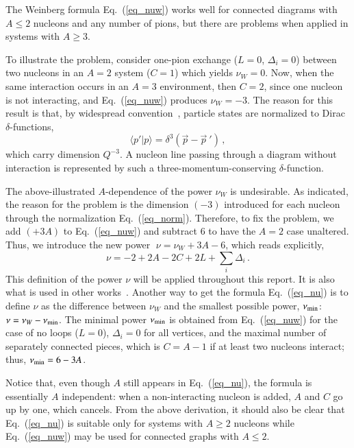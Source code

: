 \documentclass[sort&compress,preprint,3p]{elsarticle}
\begin{document}
The Weinberg formula 
Eq.~(\ref{eq_nuw})
works well for connected diagrams
with $A \leq 2$ nucleons and any number of pions, 
but there are problems when applied in 
systems with $A\geq 3$.

To illustrate the problem, consider
one-pion exchange 
($L=0$, $\Delta_i=0$) 
between two nucleons
in an $A=2$ system ($C=1$) which yields 
$\nu_W=0$.
Now, when the same interaction occurs
in an $A=3$ environment, then $C=2$, since one
nucleon is not interacting, and 
Eq.~(\ref{eq_nuw}) 
produces $\nu_W=-3$.
The reason for this result is that, by widespread convention~\cite{PDG},
particle states are normalized to Dirac $\delta$-functions,
\begin{equation}
\langle p' | p \rangle = 
\delta^3(\vec p - {\vec p}~') 
\,,
\label{eq_norm}
\end{equation}
which carry dimension $Q^{-3}$.
A nucleon line 
passing through a diagram
without interaction is represented by such a 
three-momentum-conserving
$\delta$-function. 

The above-illustrated $A$-dependence of the power $\nu_W$
is undesirable.
As indicated, the reason for the problem is the dimension $(-3)$
introduced for each nucleon through the normalization Eq.~(\ref{eq_norm}).
Therefore, to fix the problem,
we add $(+3A)$ to Eq.~(\ref{eq_nuw}) and subtract $6$ to have the $A=2$ case
unaltered.
Thus, we introduce the new power $\; \nu=\nu_W+3A-6$, which reads explicitly,
\begin{equation} \nu = -2 +2A - 2C + 2L 
+ \sum_i \Delta_i \, .  
\label{eq_nu} 
\end{equation}
This definition of the power $\nu$ will be applied
throughout this report.
It is also what is used in other works~\cite{Epe06}.
Another way to get the formula Eq.~(\ref{eq_nu}) is to define $\nu$
as the difference between $\nu_W$ and the smallest possible power,
$\nu_{\rm min}$: $\nu=\nu_W-\nu_{\rm min}$.
The minimal power $\nu_{\rm min}$ is obtained from Eq.~(\ref{eq_nuw})
for the case of no loops ($L=0$), $\Delta_i=0$ for all vertices, and the 
maximal number of separately connected pieces, which is $C=A-1$
if at least two nucleons interact;
thus, $\nu_{\rm min}=6-3A$.

Notice that, even though $A$ still appears in 
Eq.~(\ref{eq_nu}), 
the formula is essentially $A$ independent:
when a non-interacting nucleon is added,
$A$ and $C$ go up by one, which cancels.
From the above derivation, 
it should also be clear that Eq.~(\ref{eq_nu})
is suitable only for systems with $A \geq 2$ nucleons
while 
Eq.~(\ref{eq_nuw})
may be used for connected graphs with $A \leq 2$.
\end{document}
